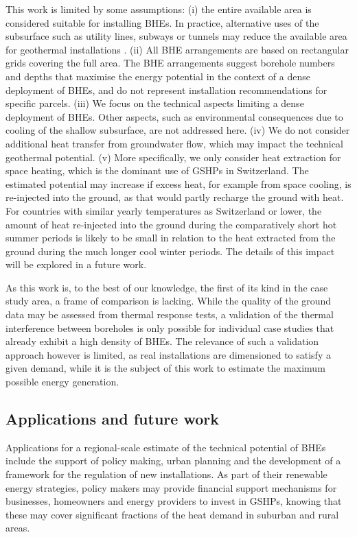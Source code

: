 This work is limited by some assumptions:
(i) the entire available area is considered suitable for installing BHEs. 
In practice, alternative uses of the subsurface such as utility lines, subways or tunnels may reduce the available area for geothermal installations \cite{li_integrated_2016}.
(ii) All BHE arrangements are based on rectangular grids covering the full area. 
The BHE arrangements suggest borehole numbers and depths that maximise the energy potential in the context of a dense deployment of BHEs, and do not represent installation recommendations for specific parcels.
(iii) We focus on the technical aspects limiting a dense deployment of BHEs.
Other aspects, such as environmental consequences due to cooling of the shallow subsurface, are not addressed here.
(iv) We do not consider additional heat transfer from groundwater flow, which may impact the technical geothermal potential. 
(v) More specifically, we only consider heat extraction for space heating, which is the dominant use of GSHPs in Switzerland.
The estimated potential may increase if excess heat, for example from space cooling, is re-injected into the ground, as that would partly recharge the ground with heat.
For countries with similar yearly temperatures as Switzerland or lower, the amount of heat re-injected into the ground during the comparatively short hot summer periods is likely to be small in relation to the heat extracted from the ground during the much longer cool winter periods. The details of this impact will be explored in a future work.

As this work is, to the best of our knowledge, the first of its kind in the case study area, a frame of comparison is lacking. 
While the quality of the ground data may be assessed from thermal response tests, a validation of the thermal interference between boreholes is only possible for individual case studies that already exhibit a high density of BHEs. 
The relevance of such a validation approach however is limited, as real installations are dimensioned to satisfy a given demand, while it is the subject of this work to estimate the maximum possible energy generation.


\subsection{Applications and future work}
\label{application_BHE}

Applications for a regional-scale estimate of the technical potential of BHEs include the support of policy making, urban planning and the development of a framework for the regulation of new installations. 
As part of their renewable energy strategies, policy makers may provide financial support mechanisms for businesses, homeowners and energy providers to invest in GSHPs, knowing that these may cover significant fractions of the heat demand in suburban and rural areas. 

